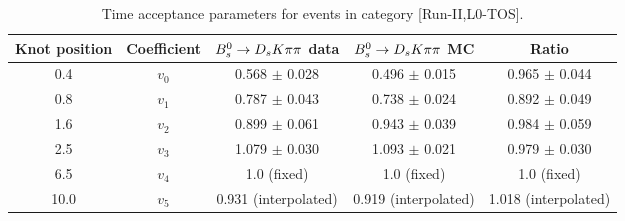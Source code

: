 \begin{table}[hp!]
\centering
\small
\caption{Time acceptance parameters for events in category [\textsf{Run-II},\textsf{L0-TOS}].}
\begin{tabular}{c c c c c}
\hline
\hline
Knot position & Coefficient & ${{B}^0_{s}}\rightarrow{\ensuremath{{D}_{s}}}{\ensuremath{K}}{\ensuremath{\pi}}{\ensuremath{\pi}}$ data & ${{B}^0_{s}}\rightarrow{\ensuremath{{D}_{s}}}{\ensuremath{K}}{\ensuremath{\pi}}{\ensuremath{\pi}}$ MC & Ratio \\
\hline
0.4 & $v_{0}$ & 0.568 $\pm$ 0.028 & 0.496 $\pm$ 0.015 & 0.965 $\pm$ 0.044\\
0.8 & $v_{1}$ & 0.787 $\pm$ 0.043 & 0.738 $\pm$ 0.024 & 0.892 $\pm$ 0.049\\
1.6 & $v_{2}$ & 0.899 $\pm$ 0.061 & 0.943 $\pm$ 0.039 & 0.984 $\pm$ 0.059\\
2.5 & $v_{3}$ & 1.079 $\pm$ 0.030 & 1.093 $\pm$ 0.021 & 0.979 $\pm$ 0.030\\
6.5 & $v_{4}$ &  1.0 (fixed) & 1.0 (fixed) & 1.0 (fixed)\\
10.0 & $v_{5}$ & 0.931 (interpolated) & 0.919 (interpolated) & 1.018 (interpolated) \\
\hline
\hline
\end{tabular}
\label{table:splines}
\end{table}